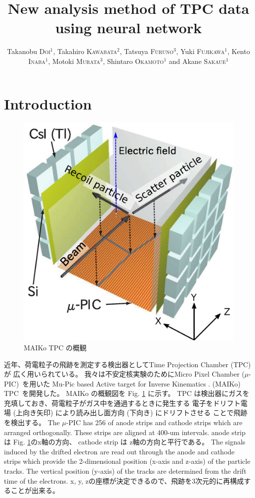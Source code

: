 \documentclass{jps-cp}
\title{New analysis method of TPC data using neural network}
\author{
  Takanobu \textsc{Doi}$^{1}$, Takahiro \textsc{Kawabata}$^{2}$, Tatsuya \textsc{Furuno}$^{3}$,
  Yuki \textsc{Fujikawa}$^{1}$, Kento \textsc{Inaba}$^{1}$, Motoki \textsc{Murata}$^{3}$,
  Shintaro \textsc{Okamoto}$^{1}$ and Akane \textsc{Sakaue}$^{1}$}
\begin{document}
\maketitle

\section{Introduction}
\begin{figure}
  \vspace{0zw}
  \centering
  \includegraphics[clip, width=16zw]{eps/MAIKo.eps}
  \caption{MAIKo TPC の概観}
  \label{fig:MAIKo}
  \vspace{0zw}
\end{figure}
近年、荷電粒子の飛跡を測定する検出器としてTime Projection Chamber (TPC) が
広く用いられている。
我々は不安定核実験のためにMicro Pixel Chamber ($\mu$-PIC)~\cite{mupic}を用いた
Mu-Pic based Active target for Inverse Kinematics . (MAIKo) TPC~\cite{MAIKo}を開発した。
MAIKo の概観図を Fig. \ref{fig:MAIKo} に示す。
TPC は検出器にガスを充填しておき、荷電粒子がガス中を通過するときに発生する
電子をドリフト電場 (上向き矢印) により読み出し面方向 (下向き) にドリフトさせる
ことで飛跡を検出する。
The $\mu$-PIC has 256 of anode strips and cathode strips
which are arranged orthogonally.
These strips are aligned at 400-um intervals.
anode strip は Fig. \ref{fig:MAIKo}のx軸の方向、
cathode strip は z軸の方向と平行である。
The signals induced by the drifted electron are read out through the anode and 
cathode strips which provide the 2-dimensional position (x-axis and z-axis) 
of the particle tracks.
The vertical position (y-axis) of the tracks are determined 
from the drift time of the electrons.
x, y, zの座標が決定できるので、飛跡を3次元的に再構成することが出来る。
\end{document}
